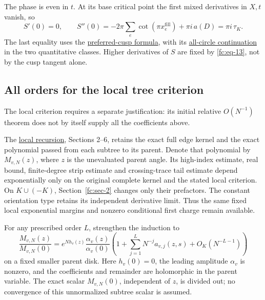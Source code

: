 The phase is even in \(t\). At its base critical point the first mixed derivatives in \(X,t\) vanish, so
\begin{equation}\label{fc:eq-16}
S'(0)=0,\qquad
 S''(0)=-2\pi\sum_e\cot(\pi x_e^{\mathrm{fill}})
                                      +\pi i\,a(D)
        =\pi i\,\tau_K.
\end{equation}
 The last equality uses the \href{https://sashakolpakov.github.io/murakamis_dream/notes/actual_main_meridian_preferred_cusp.html}{preferred-cusp formula}, with its \href{https://sashakolpakov.github.io/murakamis_dream/notes/actual_all_circle_preferred_cusp.html}{all-circle continuation} in the two quantitative classes. Higher derivatives of \(S\) are fixed by \eqref{fc:eq-13}, not by the cusp tangent alone.

\subsection{All orders for the local tree criterion}\label{fc:sec-4-1}

The local criterion requires a separate justification: its initial relative \(O(N^{-1})\) theorem does not by itself supply all the coefficients above.

The \href{https://sashakolpakov.github.io/murakamis_dream/notes/actual_all_circle_local_message_volume.html}{local recursion}, Sections 2--6, retains the exact full edge kernel and the exact polynomial passed from each subtree to its parent. Denote that polynomial by \(M_{v,N}(z)\), where \(z\) is the unevaluated parent angle. Its high-index estimate, real bound, finite-degree strip estimate and crossing-trace tail estimate depend exponentially only on the original complete kernel and the stated local criterion. On \(K\cup(-K)\), Section~\ref{fc:sec-2} changes only their prefactors. The constant orientation type retains its independent derivative limit. Thus the same fixed local exponential margins and nonzero conditional first charge remain available.

For any prescribed order \(L\), strengthen the induction to
\begin{equation}\label{fc:eq-16a}
\frac{M_{v,N}(z)}{M_{v,N}(0)}
 =e^{Nh_v(z)}\frac{\alpha_v(z)}{\alpha_v(0)}
 \left(1+\sum_{j=1}^{L}N^{-j}a_{v,j}(z,s)
                    +O_K(N^{-L-1})\right)
\end{equation}
 on a fixed smaller parent disk. Here \(h_v(0)=0\), the leading amplitude \(\alpha_v\) is nonzero, and the coefficients and remainder are holomorphic in the parent variable. The exact scalar \(M_{v,N}(0)\), independent of \(z\), is divided out; no convergence of this unnormalized subtree scalar is assumed.

